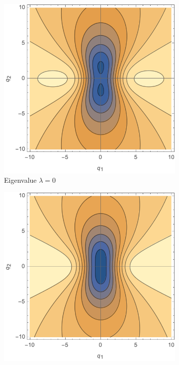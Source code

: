 \documentclass[a4paper, 11pt]{article}
\begin{document}
\begin{figure}
\centering
\begin{subfigure}[b]{0.45\textwidth}
\includegraphics[width=\textwidth]{A4Mean_lambda=000}
\caption{Eigenvalue $\lambda=0$}
\end{subfigure}
\begin{subfigure}[b]{0.45\textwidth}
\includegraphics[width=\textwidth]{A4Mean_lambda=025}

\end{subfigure}
\end{figure}
\end{document}
